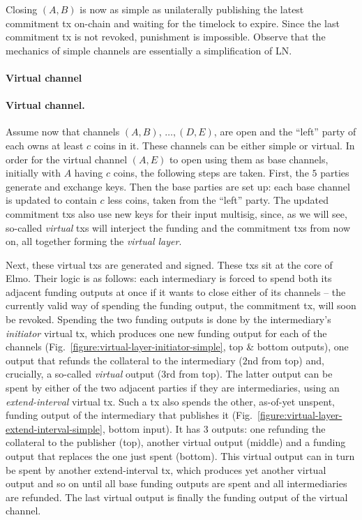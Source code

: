   Closing $(A, B)$ is now as simple as unilaterally publishing the latest
  commitment tx on-chain and waiting for the timelock to expire. Since the last
  commitment tx is not revoked, punishment is impossible. Observe that the
  mechanics of simple channels are essentially a simplification of LN.

  \makeatletter%
    {\paragraph{Virtual channel}}%
    {\paragraph{Virtual channel.}}%
  \makeatother%
  Assume now that channels $(A, B)$, $\dots,(D, E)$, are open and the ``left''
  party of each owns at least $c$ coins in it. These channels can be either
  simple or virtual. In order for the virtual channel $(A, E)$ to open using
  them as base channels, initially with $A$ having $c$ coins, the following
  steps are taken. First, the $5$ parties generate and exchange keys. Then the
  base parties are set up: each base channel is updated to contain $c$ less
  coins, taken from the ``left'' party. The updated commitment txs also use new
  keys for their input multisig, since, as we will see, so-called \emph{virtual}
  txs will interject the funding and the commitment txs from now on, all
  together forming the \emph{virtual layer}.

  Next, these virtual txs are generated and signed. These txs sit at the core of
  Elmo. Their logic is as follows: each intermediary is forced to spend both its
  adjacent funding outputs at once if it wants to close either of its channels
  -- the currently valid way of spending the funding output, the commitment tx,
  will soon be revoked. Spending the two funding outputs is done by the
  intermediary's \emph{initiator} virtual tx, which produces one new funding
  output for each of the channels
  (Fig.~\ref{figure:virtual-layer-initiator-simple}, top \& bottom outputs), one
  output that refunds the collateral to the intermediary ($2$nd from top) and,
  crucially, a so-called \emph{virtual} output ($3$rd from top). The latter
  output can be spent by either of the two adjacent parties if they are
  intermediaries, using an \emph{extend-interval} virtual tx. Such a tx also
  spends the other, as-of-yet unspent, funding output of the intermediary that
  publishes it (Fig.~\ref{figure:virtual-layer-extend-interval-simple}, bottom
  input). It has $3$ outputs: one refunding the collateral to the publisher
  (top), another virtual output (middle) and a funding output that replaces the
  one just spent (bottom). This virtual output can in turn be spent by another
  extend-interval tx, which produces yet another virtual output and so on until
  all base funding outputs are spent and all intermediaries are refunded. The
  last virtual output is finally the funding output of the virtual channel.

